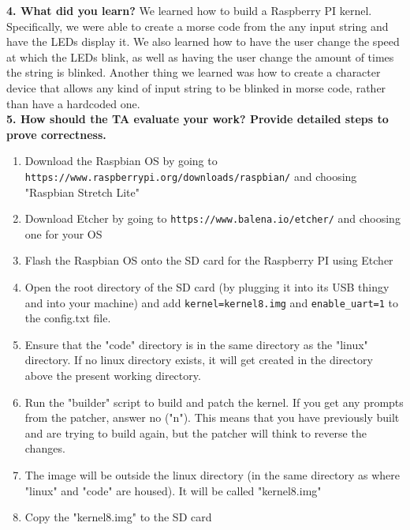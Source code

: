 \documentclass[10pt,english]{article}
\begin{document}
\noindent \textbf{4. What did you learn?}
We learned how to build a Raspberry PI kernel. Specifically, we were able to create a morse code from the any input string and have the LEDs display it. We also learned how to have the user change the speed at which the LEDs blink, as well as having the user change the amount of times the string is blinked. Another thing we learned was how to create a character device that allows any kind of input string to be blinked in morse code, rather than have a hardcoded one. \\

\noindent \textbf{5. How should the TA evaluate your work? Provide detailed steps to prove correctness.}
\begin{enumerate}
\item Download the Raspbian OS by going to \verb|https://www.raspberrypi.org/downloads/raspbian/| and choosing "Raspbian Stretch Lite"
\item Download Etcher by going to \verb|https://www.balena.io/etcher/| and choosing one for your OS
\item Flash the Raspbian OS onto the SD card for the Raspberry PI using Etcher
\item Open the root directory of the SD card (by plugging it into its USB thingy and into your machine) and add \verb|kernel=kernel8.img| and \verb|enable_uart=1| to the config.txt file.
\item Ensure that the "code" directory is in the same directory as the "linux" directory. If no linux directory exists, it will get created in the directory above the present working directory.
\item Run the "builder" script to build and patch the kernel. If you get any prompts from the patcher, answer no ("n"). This means that you have previously built and are trying to build again, but the patcher will think to reverse the changes. 
\item The image will be outside the linux directory (in the same directory as where "linux" and "code" are housed). It will be called "kernel8.img"
\item Copy the "kernel8.img" to the SD card \\
\end{enumerate}
\end{document}
